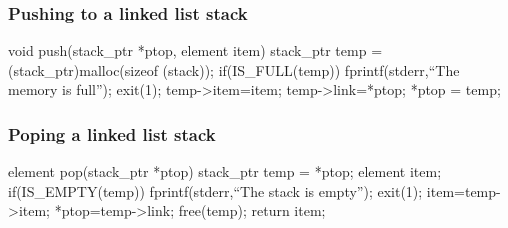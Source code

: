 \documentclass[newPxFont,sthlmFooter,nooffset]{beamer}
\begin{document}
\begin{frame}[t, fragile]
  \frametitle{Pushing to a linked list stack}
  \begin{ncodedef}
void push(stack_ptr *ptop, element item) { 
    stack_ptr temp = (stack_ptr)malloc(sizeof (stack)); 
    if(IS_FULL(temp)) {
        fprintf(stderr,``The memory is full\n'');
        exit(1); 
    }
    temp->item=item; 
    temp->link=*ptop; 
    *ptop = temp;
}    
  \end{ncodedef}
\end{frame}


\begin{frame}[t, fragile]
  \frametitle{Poping a linked list stack}
  \begin{ncodedef}
element pop(stack_ptr *ptop) { 
    stack_ptr temp = *ptop; 
    element item; 
    if(IS_EMPTY(temp)) {
        fprintf(stderr,``The stack is empty\n'');
        exit(1); 
     }
     item=temp->item; 
     *ptop=temp->link; 
     free(temp); 
     return item;
}    
  \end{ncodedef}
\end{frame}
\end{document}
